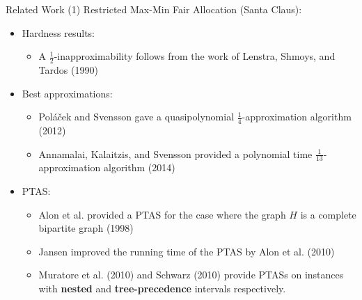 \begin{frame}[t]{Related Work (1)}
	Restricted Max-Min Fair Allocation (Santa Claus):
	    \begin{itemize}
	    	\item<2-> Hardness results:
                \begin{itemize}
            	    \item<3-> A $\frac{1}{2}$-inapproximability follows from the work of Lenstra, Shmoys, and Tardos (1990)
		        \end{itemize}
            \item<4-> Best approximations:
                \begin{itemize}
                    \item<5-> Pol\'{a}\v{c}ek and Svensson gave a quasipolynomial $\frac{1}{4}$-approximation algorithm (2012)
                    \item<6-> Annamalai, Kalaitzis, and Svensson provided a polynomial time $\frac{1}{13}$-approximation algorithm (2014)
                \end{itemize}
            \item<7-> PTAS:
                \begin{itemize}
                    \item<8-> Alon et al. provided a PTAS for the case where the graph $H$ is a complete bipartite graph (1998)
                    \item<9-> Jansen improved the running time of the PTAS by Alon et al. (2010)
                    \item<11-> Muratore et al. (2010) and Schwarz (2010) provide PTASs on instances with \textbf{nested} and \textbf{tree-precedence} intervals respectively.
                \end{itemize}
	       \end{itemize}
\end{frame}

